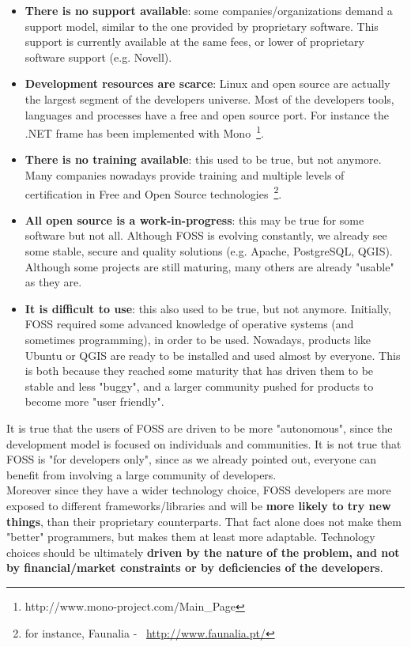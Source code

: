 \documentclass[11pt]{article} %
\begin{document}
\begin{itemize}
\item \textbf{There is no support available}: some companies/organizations demand a support model, similar to the one provided by proprietary software. This support is currently available at the same fees, or lower of proprietary software support (e.g. Novell).
\item \textbf{Development resources are scarce}: Linux and open source are actually the largest segment of the developers universe. Most of the developers tools, languages and processes have a free and open source port. For instance the .NET frame has been implemented with Mono~\footnote{http://www.mono-project.com/Main\_Page}.
\item \textbf{There is no training available}: this used to be true, but not anymore. Many companies nowadays provide training and multiple levels of certification in Free and Open Source technologies~\footnote{for instance, Faunalia - ~\url{http://www.faunalia.pt/}}.
\item \textbf{All open source is a work-in-progress}: this may be true for some software but not all. Although FOSS is evolving constantly, we already see some stable, secure and quality solutions (e.g. Apache, PostgreSQL, QGIS). Although some projects are still maturing, many others are already "usable" as they are.
\item \textbf{It is difficult to use}: this also used to be true, but not anymore. Initially, FOSS required some advanced knowledge of operative systems (and sometimes programming), in order to be used. Nowadays, products like Ubuntu or QGIS are ready to be installed and used almost by everyone. This is both because they reached some maturity that has driven them to be stable and less "buggy", and a larger community pushed for products to become more "user friendly". %
\end{itemize}
It is true that the users of FOSS are driven to be more "autonomous", since the development model is focused on individuals and communities. It is not true that FOSS is "for developers only", since as we already pointed out, everyone can benefit from involving a large community of developers.\\
Moreover since they have a wider technology choice, FOSS developers are more exposed to different frameworks/libraries and will be \textbf{more likely to try new things}, than their proprietary counterparts. That fact alone does not make them "better" programmers, but makes them at least more adaptable. Technology choices should be ultimately \textbf{driven by the nature of the problem, and not by financial/market constraints or by deficiencies of the developers}.\\
\end{document}
